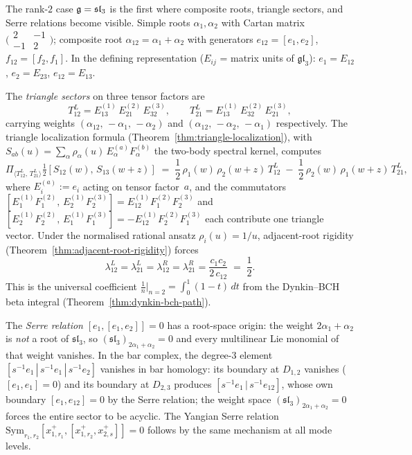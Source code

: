 \begin{computation}%
\label{comp:sl3-yangian-triangle}%
%
%
The rank-$2$ case $\mathfrak{g} = \mathfrak{sl}_3$ is the first where
composite roots, triangle sectors, and Serre relations become
visible. Simple roots $\alpha_1, \alpha_2$ with Cartan matrix
$\bigl(\begin{smallmatrix} 2 & -1 \\ -1 & 2
\end{smallmatrix}\bigr)$;
composite root $\alpha_{12} = \alpha_1 + \alpha_2$ with
generators $e_{12} = [e_1, e_2]$, $f_{12} = [f_2, f_1]$.
In the defining representation ($E_{ij}$ = matrix units of
$\mathfrak{gl}_3$): $e_1 = E_{12}$, $e_2 = E_{23}$,
$e_{12} = E_{13}$.

The \emph{triangle sectors} on three tensor factors are
\[
T^L_{12} = E_{13}^{(1)}\,E_{21}^{(2)}\,E_{32}^{(3)},
\qquad
T^L_{21} = E_{13}^{(1)}\,E_{32}^{(2)}\,E_{21}^{(3)},
\]
carrying weights $(\alpha_{12},\,-\alpha_1,\,-\alpha_2)$ and
$(\alpha_{12},\,-\alpha_2,\,-\alpha_1)$ respectively.
The triangle localization formula
(Theorem~\ref{thm:triangle-localization}), with
$S_{ab}(u) = \sum_\alpha \rho_\alpha(u)\,E_\alpha^{(a)}F_\alpha^{(b)}$
the two-body spectral kernel, computes
\[
\Pi_{\langle T^L_{12},\,T^L_{21}\rangle}
\tfrac12[S_{12}(w),\,S_{13}(w{+}z)]
\;=\;
\frac{1}{2}\,\rho_1(w)\,\rho_2(w{+}z)\,T^L_{12}
\;-\;
\frac{1}{2}\,\rho_2(w)\,\rho_1(w{+}z)\,T^L_{21},
\]
where $E_i^{(a)} := e_i$ acting on tensor factor~$a$, and the
commutators $[E_1^{(1)}F_1^{(2)},\,
E_2^{(1)}F_2^{(3)}] = E_{12}^{(1)}F_1^{(2)}F_2^{(3)}$
and $[E_2^{(1)}F_2^{(2)},\,E_1^{(1)}F_1^{(3)}]
= -E_{12}^{(1)}F_2^{(2)}F_1^{(3)}$ each contribute one
triangle vector. Under the normalised rational ansatz
$\rho_i(u) = 1/u$, adjacent-root rigidity
(Theorem~\ref{thm:adjacent-root-rigidity}) forces
\[
\lambda^L_{12} = \lambda^L_{21}
= \lambda^R_{12} = \lambda^R_{21}
= \frac{c_1 c_2}{2\,c_{12}}
\;=\;\frac12.
\]
This is the universal coefficient
$\frac1n\big|_{n=2} = \int_0^1(1-t)\,dt$
from the Dynkin--BCH beta integral
(Theorem~\ref{thm:dynkin-bch-path}).

The \emph{Serre relation} $[e_1,[e_1,e_2]] = 0$ has
a root-space origin: the weight $2\alpha_1 + \alpha_2$ is
\emph{not} a root of $\mathfrak{sl}_3$, so
$(\mathfrak{sl}_3)_{2\alpha_1 + \alpha_2} = 0$ and
every multilinear Lie monomial of that weight vanishes.
In the bar complex, the degree-$3$ element
$[s^{-1}e_1\,|\,s^{-1}e_1\,|\,s^{-1}e_2]$ vanishes in
bar homology: its boundary at $D_{1,2}$ vanishes
($[e_1,e_1] = 0$) and its boundary at $D_{2,3}$ produces
$[s^{-1}e_1\,|\,s^{-1}e_{12}]$, whose own boundary
$[e_1, e_{12}] = 0$ by the Serre relation; the weight
space $(\mathfrak{sl}_3)_{2\alpha_1+\alpha_2} = 0$
forces the entire sector to be acyclic. The Yangian Serre relation
$\mathrm{Sym}_{r_1,r_2}[x^+_{1,r_1},[x^+_{1,r_2},
x^+_{2,s}]] = 0$ follows by the same mechanism at all mode
levels.
\end{computation}

